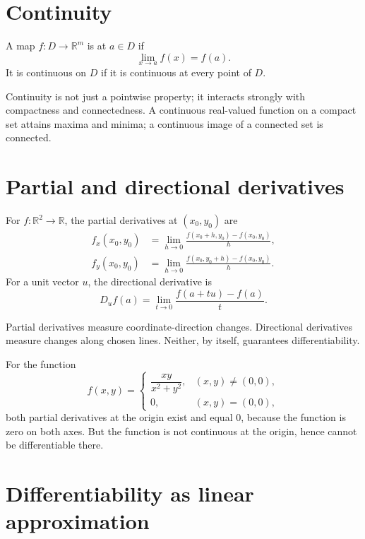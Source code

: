 \section{Continuity}

\begin{definition}
A map \(f:D\to\mathbb R^m\) is  at \(a\in D\) if
\[
  \lim_{x\to a}f(x)=f(a).
\]
It is continuous on \(D\) if it is continuous at every point of \(D\).
\end{definition}

Continuity is not just a pointwise property; it interacts strongly with compactness and connectedness.  A continuous real-valued function on a compact set attains maxima and minima; a continuous image of a connected set is connected.

\section{Partial and directional derivatives}

For \(f:\mathbb R^2\to\mathbb R\), the partial derivatives at \((x_0,y_0)\) are
\[
\begin{aligned}
  f_x(x_0,y_0)&=\lim_{h\to0}\frac{f(x_0+h,y_0)-f(x_0,y_0)}h,\\
  f_y(x_0,y_0)&=\lim_{h\to0}\frac{f(x_0,y_0+h)-f(x_0,y_0)}h.
\end{aligned}
\]
For a unit vector \(u\), the directional derivative is
\[
  D_uf(a)=\lim_{t\to0}\frac{f(a+tu)-f(a)}t.
\]

Partial derivatives measure coordinate-direction changes.  Directional derivatives measure changes along chosen lines.  Neither, by itself, guarantees differentiability.

\begin{example}
For the function
\[
  f(x,y)=
  \begin{cases}
  \dfrac{xy}{x^2+y^2},&(x,y)\ne(0,0),\\
  0,&(x,y)=(0,0),
  \end{cases}
\]
both partial derivatives at the origin exist and equal \(0\), because the function is zero on both axes.  But the function is not continuous at the origin, hence cannot be differentiable there.
\end{example}

\section{Differentiability as linear approximation}

